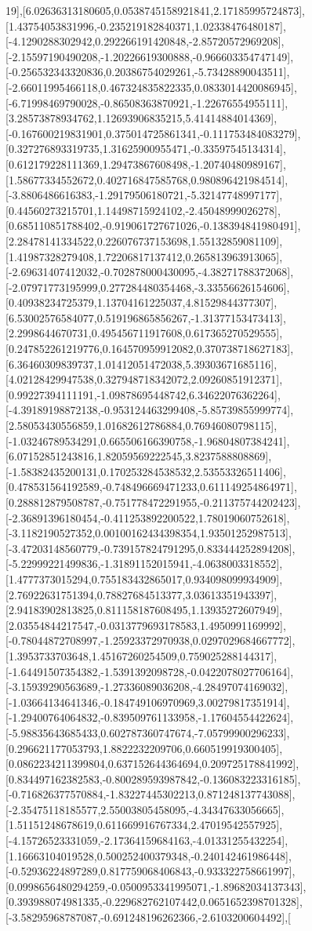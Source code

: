 \documentclass{article}
\begin{document}
19],[6.02636313180605,0.0538745158921841,2.17185995724873],[1.43754053831996,-0.235219182840371,1.02338476480187],[-4.1290288302942,0.292266191420848,-2.85720572969208],[-2.15597190490208,-1.20226619300888,-0.966603354747149],[-0.256532343320836,0.20386754029261,-5.73428890043511],[-2.66011995466118,0.467324835822335,0.0833014420086945],[-6.71998469790028,-0.86508363870921,-1.22676554955111],[3.28573878934762,1.12693906835215,5.41414884014369],[-0.167600219831901,0.375014725861341,-0.111753484083279],[0.327276893319735,1.31625900955471,-0.33597545134314],[0.612179228111369,1.29473867608498,-1.20740480989167],[1.58677334552672,0.402716847585768,0.980896421984514],[-3.8806486616383,-1.29179506180721,-5.32147748997177],[0.44560273215701,1.14498715924102,-2.45048999026278],[0.685110851788402,-0.919061727671026,-0.138394841980491],[2.28478141334522,0.226076737153698,1.55132859081109],[1.41987328279408,1.72206817137412,0.265813963913065],[-2.69631407412032,-0.702878000430095,-4.38271788372068],[-2.07971773195999,0.277284480354468,-3.33556626154606],[0.40938234725379,1.13704161225037,4.81529844377307],[6.53002576584077,0.519196865856267,-1.31377153473413],[2.2998644670731,0.495456711917608,0.617365270529555],[0.247852261219776,0.164570959912082,0.370738718627183],[6.36460309839737,1.01412051472038,5.39303671685116],[4.02128429947538,0.327948718342072,2.09260851912371],[0.99227394111191,-1.09878695448742,6.34622076362264],[-4.39189198872138,-0.953124463299408,-5.85739855999774],[2.58053430556859,1.01682612786884,0.76946080798115],[-1.03246789534291,0.665506166390758,-1.96804807384241],[6.07152851243816,1.82059569222545,3.8237588808869],[-1.58382435200131,0.170253284538532,2.53553326511406],[0.478531564192589,-0.748496669471233,0.611149254864971],[0.288812879508787,-0.751778472291955,-0.211375744202423],[-2.36891396180454,-0.411253892200522,1.78019060752618],[-3.1182190527352,0.00100162434398354,1.93501252987513],[-3.47203148560779,-0.739157824791295,0.833444252894208],[-5.22999221499836,-1.31891152015941,-4.0638003318552],[1.4777373015294,0.755183432865017,0.934098099934909],[2.76922631751394,0.78827684513377,3.03613351943397],[2.94183902813825,0.811158187608495,1.13935272607949],[2.03554844217547,-0.0313779693178583,1.4950991169992],[-0.78044872708997,-1.25923372970938,0.0297029684667772],[1.3953733703648,1.45167260254509,0.759025288144317],[-1.64491507354382,-1.5391392098728,-0.0422078027706164],[-3.15939290563689,-1.27336089036208,-4.28497074169032],[-1.03664134641346,-0.184749106970969,3.00279817351914],[-1.29400764064832,-0.839509761133958,-1.17604554422624],[-5.98835643685433,0.602787360747674,-7.05799900296233],[0.296621177053793,1.8822232209706,0.660519919300405],[0.0862234211399804,0.637152644364694,0.209725178841992],[0.834497162382583,-0.800289593987842,-0.136083223316185],[-0.716826377570884,-1.83227445302213,0.871248137743088],[-2.35475118185577,2.55003805458095,-4.34347633056665],[1.51151248678619,0.611669916767334,2.47019542557925],[-4.15726523331059,-2.17364159684163,-4.01331255432254],[1.16663104019528,0.500252400379348,-0.240142461986448],[-0.52936224897289,0.817759068406843,-0.933322758661997],[0.0998656480294259,-0.0500953341995071,-1.89682034137343],[0.393988074981335,-0.229682762107442,0.0651652398701328],[-3.58295968787087,-0.691248196262366,-2.6103200604492],[
\end{document}
